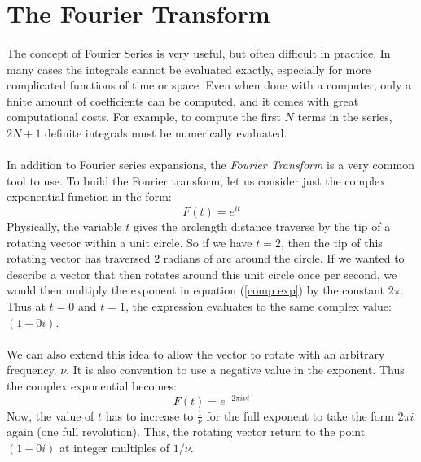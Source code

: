 \documentclass[12pt,letterpaper]{article}
\begin{document}

\section{The Fourier Transform}
\paragraph*{}The concept of Fourier Series is very useful, but often difficult in practice. In many cases the integrals cannot be evaluated exactly, especially for more complicated functions of time or space. Even when done with a computer, only a finite amount of coefficients can be computed, and it comes with great computational costs. For example, to compute the first $N$ terms in the series, $2N + 1$ definite integrals must be numerically evaluated.
\paragraph*{}In addition to Fourier series expansions, the \textit{Fourier Transform} is a very common tool to use. To build the Fourier transform, let us consider just the complex exponential function in the form:
\begin{equation}
\label{comp exp}
F(t) = e^{it}
\end{equation}
Physically, the variable $t$ gives the arclength distance traverse by the tip of a rotating vector within a unit circle. So if we have $t=2$, then the tip of this rotating vector has traversed $2$ radians of arc around the circle. If we wanted to describe a vector that then rotates around this unit circle once per second, we would then multiply the exponent in equation (\ref{comp exp}) by the constant $2\pi$. Thus at $t=0$ and $t=1$, the expression evaluates to the same complex value: $(1 + 0i)$.
\paragraph*{}We can also extend this idea to allow the vector to rotate with an arbitrary frequency, $\nu$. It is also convention to use a negative value in the exponent. Thus the complex exponential becomes:
\begin{equation}
\label{comp exp 2}
F(t) = e^{-2\pi i\nu t}
\end{equation}
Now, the value of $t$ has to increase to $\frac{1}{\nu}$ for the full exponent to take the form $2\pi i$ again (one full revolution). This, the rotating vector return to the point $(1 + 0i)$ at integer multiples of $1/\nu$.
\end{document}
